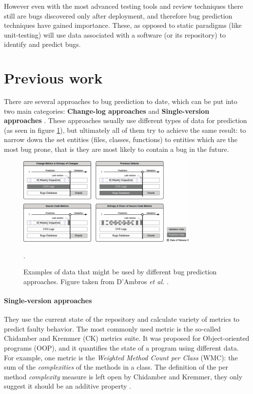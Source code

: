 \documentclass[12pt,twoside,notitlepage]{report}
\newcommand{\etal}{\textit{et al.}}
\begin{document}
However even with the most advanced testing tools and review techniques there still are bugs discovered only after deployment, and therefore bug prediction techniques have gained importance. These, as opposed to static paradigms (like unit-testing) will use data associated with a software (or its repository) to identify and predict bugs.

\section{Previous work}
There are several approaches to bug prediction to date, which can be put into two main categories: \textbf{Change-log approaches} and \textbf{Single-version approaches} \cite{5463279}. These approaches usually use different types of data for prediction (as seen in figure \ref{bug_prediction_data}), but ultimately all of them try to achieve the same result: to narrow down the set entities (files, classes, functions) to entities which are the most bug prone, that is they are most likely to contain a bug in the future.
\begin{figure}[h]
\vspace*{0.1in}
\hspace*{0.1\textwidth}
\includegraphics[width=0.8\textwidth]{bug_prediction_data.png}
\centering
\captionsetup{width=0.7\textwidth}

\caption[Examples of data that might be used by different bug prediction approaches]{Examples of data that might be used by different bug prediction approaches. Figure taken from D'Ambros \etal{} \cite{5463279}.}.
\label{bug_prediction_data}
\end{figure}

\paragraph{Single-version approaches}They use the current state of the repository and calculate variety of metrics  to predict faulty behavior. The most commonly used metric is the so-called Chidamber and Kremmer (CK) metrics suite\cite{295895}. It was proposed for Object-oriented programs (OOP), and it quantifies the state of a program using different data. For example, one metric is the \textit{Weighted Method Count per Class} (WMC): the sum of the \textit{complexities} of the methods in a class. The definition of the per method \textit{complexity} measure is left open by Chidamber and Kremmer, they only suggest it should be an additive property \cite{295895}.
\end{document}
